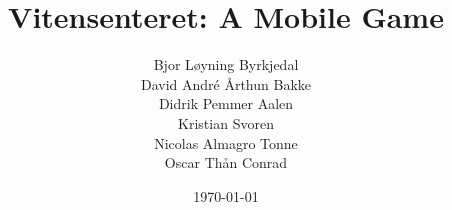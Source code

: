 \newcommand{\mytitle}{Vitensenteret: A Mobile Game}
\newcommand{\mygroupnumber}{16}
\newcommand{\myauthor}{Bjor Løyning Byrkjedal\\David André Årthun Bakke\\Didrik Pemmer Aalen\\Kristian Svoren\\Nicolas Almagro Tonne\\Oscar Thån Conrad}

\title{\mytitle}
\author{\myauthor}
\date{\today}

